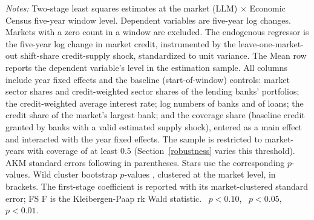 \begin{threeparttable}
\begin{tablenotes}[flushleft]
        \item \textit{Notes:} Two-stage least squares estimates at the market (LLM) $\times$ Economic Census five-year window level. Dependent variables are five-year log changes. Markets with a zero count in a window are excluded. The endogenous regressor is the five-year log change in market credit, instrumented by the leave-one-market-out shift-share credit-supply shock, standardized to unit variance. The Mean row reports the dependent variable's level in the estimation sample. All columns include year fixed effects and the baseline (start-of-window) controls: market sector shares and credit-weighted sector shares of the lending banks' portfolios; the credit-weighted average interest rate; log numbers of banks and of loans; the credit share of the market's largest bank; and the coverage share (baseline credit granted by banks with a valid estimated supply shock), entered as a main effect and interacted with the year fixed effects. The sample is restricted to market-years with coverage of at least $0.5$ (Section~\ref{robustness} varies this threshold). AKM standard errors following \citet{adao2019shiftshare} in parentheses. Stars use the corresponding $p$-values. Wild cluster bootstrap $p$-values \citep{cameron2008bootstrap}, clustered at the market level, in brackets. The first-stage coefficient is reported with its market-clustered standard error; FS F is the Kleibergen-Paap rk Wald statistic. \sym{*}~$p<0.10$, \sym{**}~$p<0.05$, \sym{***}~$p<0.01$.
    \end{tablenotes}
\end{threeparttable}
